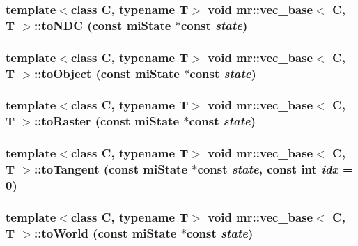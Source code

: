 \subsubsection{\setlength{\rightskip}{0pt plus 5cm}template$<$class C, typename T$>$ void {\bf mr::vec\_\-base}$<$ C, T $>$::to\-NDC (const mi\-State $\ast$const {\em state})\hspace{0.3cm}{\tt  [inline]}}\label{structmr_1_1vec__base_a5}


\subsubsection{\setlength{\rightskip}{0pt plus 5cm}template$<$class C, typename T$>$ void {\bf mr::vec\_\-base}$<$ C, T $>$::to\-Object (const mi\-State $\ast$const {\em state})\hspace{0.3cm}{\tt  [inline]}}\label{structmr_1_1vec__base_a1}


\subsubsection{\setlength{\rightskip}{0pt plus 5cm}template$<$class C, typename T$>$ void {\bf mr::vec\_\-base}$<$ C, T $>$::to\-Raster (const mi\-State $\ast$const {\em state})\hspace{0.3cm}{\tt  [inline]}}\label{structmr_1_1vec__base_a4}


\subsubsection{\setlength{\rightskip}{0pt plus 5cm}template$<$class C, typename T$>$ void {\bf mr::vec\_\-base}$<$ C, T $>$::to\-Tangent (const mi\-State $\ast$const {\em state}, const int {\em idx} = 0)\hspace{0.3cm}{\tt  [inline]}}\label{structmr_1_1vec__base_a0}


\subsubsection{\setlength{\rightskip}{0pt plus 5cm}template$<$class C, typename T$>$ void {\bf mr::vec\_\-base}$<$ C, T $>$::to\-World (const mi\-State $\ast$const {\em state})\hspace{0.3cm}{\tt  [inline]}}\label{structmr_1_1vec__base_a2}


